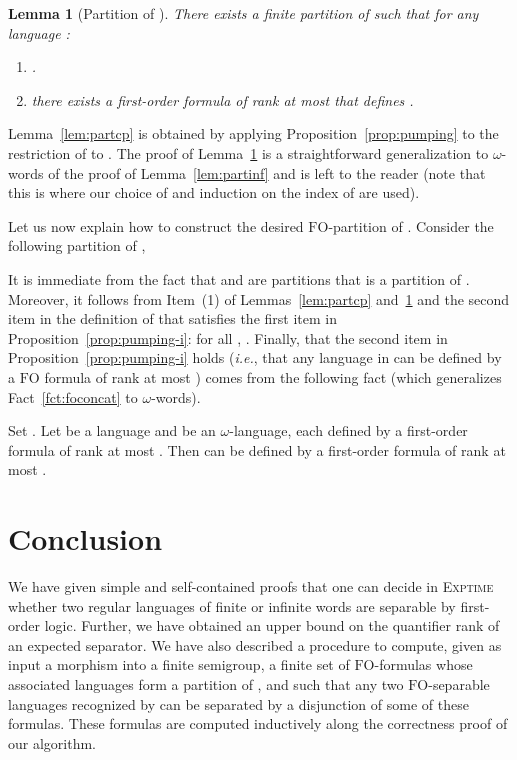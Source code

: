 \documentclass{CSML}
\newcommand{\fo}{\ensuremath{\text{FO}}\xspace}
\newcommand\ilang{\ensuremath{\omega}-language\xspace}
\newcommand\iwords{\ensuremath{\omega}-words\xspace}
\theoremstyle{plain}
\newtheorem{lemma}[thm]{Lemma}
\begin{document}
\begin{lemma}[Partition of ] \label{lem:partbc}
There exists a finite partition  of  such
that for any language :
\begin{enumerate}
\item .
\item there exists a first-order formula of
  rank at most  that defines .
\end{enumerate}
\end{lemma}

Lemma~\ref{lem:partcp} is obtained by applying
Proposition~\ref{prop:pumping} to the restriction of  to
. The proof of Lemma~\ref{lem:partbc} is a straightforward
generalization to \iwords of the proof of Lemma~\ref{lem:partinf} and
is left to the reader (note that this is where our choice of  and
induction on the index of  are used).

Let us now explain how to construct the desired \fo-partition of
. Consider the following partition  of
,

It is immediate from the fact that  and  are
partitions that  is a partition of
. Moreover, it follows from Item~(1) of
Lemmas~\ref{lem:partcp} and~\ref{lem:partbc} and the second item in
the definition of  that  satisfies the first item
in Proposition~\ref{prop:pumping-i}: for all ,
. Finally, that the
second item in Proposition~\ref{prop:pumping-i} holds (\emph{i.e.}, that any
language in  can be defined by a \fo formula of rank at most
) comes from the following fact
(which generalizes Fact~\ref{fct:foconcat} to \iwords).

\begin{fact} \label{fct:foconcati}
Set . Let  be a language and  be an \ilang, each
defined by a first-order formula of rank at most . Then
 can be defined by a first-order formula of rank at most
.
\end{fact}

\section{Conclusion}

We have given simple and self-contained proofs that one can decide in
\textsc{Exptime} whether two regular languages of finite or infinite words are
separable by first-order logic. Further, we have obtained an upper bound on the
quantifier rank of an expected separator. We have also described a procedure to
compute, given as input a morphism  into a finite semigroup, a finite
set of \fo-formulas whose associated languages form a partition of , and
such that any two \fo-separable languages recognized by  can be
separated by a disjunction of some of these formulas. These formulas are computed
inductively along the correctness proof of our algorithm.
\end{document}
